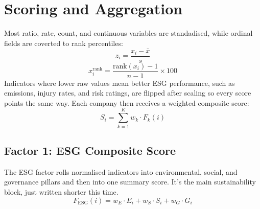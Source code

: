 \section{Scoring and Aggregation}
\label{sec:index_construction}
Most ratio, rate, count, and continuous variables are standadised, while ordinal fields are coverted to rank percentiles:
\begin{equation}
z_i = \frac{x_i - \bar{x}}{s}
\label{eq:zscore}
\end{equation}
\begin{equation}
x_i^{\text{rank}} = \frac{\text{rank}(x_i) - 1}{n - 1} \times 100
\label{eq:rankpct}
\end{equation}
Indicators where lower raw values mean better ESG performance, such as emissions, injury rates, and risk ratings, are flipped after scaling so every score points the same way.
Each company then receives a weighted composite score:
\begin{equation}
S_i = \sum_{k=1}^{K} w_k \cdot F_k(i)
\label{eq:ch3_composite}
\end{equation}

\subsection{Factor 1: ESG Composite Score}
\label{sec:esg_composite}
The ESG factor rolls normalised indicators into environmental, social, and governance pillars and then into one summary score. It's the main sustainability block, just written shorter this time.
\begin{equation}
F_{\text{ESG}}(i) = w_E \cdot E_i + w_S \cdot S_i + w_G \cdot G_i
\label{eq:esg_composite}
\end{equation}
